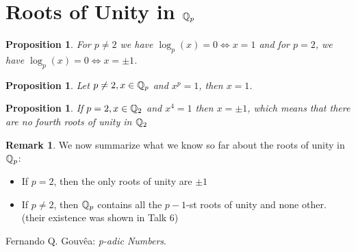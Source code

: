 \documentclass{article}
\theoremstyle{plain}
\newtheorem{prop}[thm]{Proposition}
\theoremstyle{definition}
\newtheorem{rem}[thm]{Remark}
\begin{document}
	\begin{minipage}[t]{0.45\textwidth}
	  \section{Roots of Unity in $\Bbb Q_{p}$}

		\begin{prop}
		For $p \neq 2$ we have $\log_{p}(x)=0 \iff x=1$ and for $p = 2$, we have $\log_{p}(x)=0 \iff x= \pm 1$.
		\end{prop}
		\begin{prop}
		Let $p \neq 2, x \in \Bbb Q_{p}$ and $x^{p}=1$, then $x=1$.
		\end{prop}
		\begin{prop} If $p = 2, x \in \Bbb Q_{2}$ and $x^{4} = 1$ then $x = \pm 1$, which means that there are no fourth roots of unity in $\Bbb Q_{2}$
		\end{prop}
		\begin{rem}
		We now summarize what we know so far about the roots of unity in $\Bbb Q_{p}$:
		\begin{itemize}
		\item If $p=2$, then the only roots of unity are $\pm 1$
		\item If $p \neq 2$, then $\Bbb Q_{p}$ contains all the $p-1$-st roots of unity and none other. (their existence was shown in Talk 6)
		\end{itemize}

		\end{rem}
		\begin{thebibliography}{widest-label} %

			Fernando Q. Gouv\^{e}a:
			\emph{p-adic Numbers}.


		\end{thebibliography}
	\end{minipage}
\end{document}
